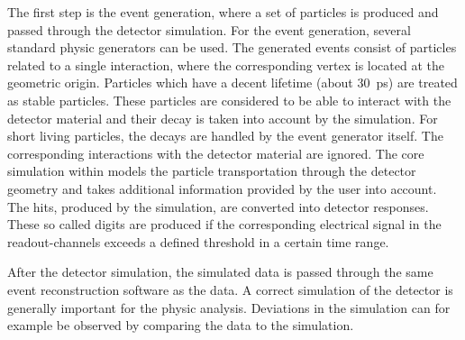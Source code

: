  
 The first step is the event generation, where a set of particles is produced and passed through the detector simulation. 
For the event generation, several standard physic generators can be used. 
 The generated events consist of particles  related to a single interaction, where the corresponding vertex is located at the geometric origin. 
 Particles which have a decent lifetime (about 30~ps) are treated as stable particles. These particles are considered to be able to interact with the detector material and their decay is taken into account by the simulation. For short living particles, the decays are handled by the event generator itself. The corresponding interactions with the detector material are ignored.  
The core simulation within   models the particle transportation through the detector geometry and takes additional information provided by the user into account. The hits,  produced by the simulation, are converted into detector responses. These so called digits are produced  if the corresponding electrical signal in the readout-channels exceeds a defined threshold in a certain time range. ~\cite{Aad:2010ah} 

After the detector simulation, the simulated data is passed through the same event reconstruction software as the data.
A correct simulation of the detector is generally  important for the physic analysis. Deviations in the simulation can  for example be observed by comparing the data to the simulation.
